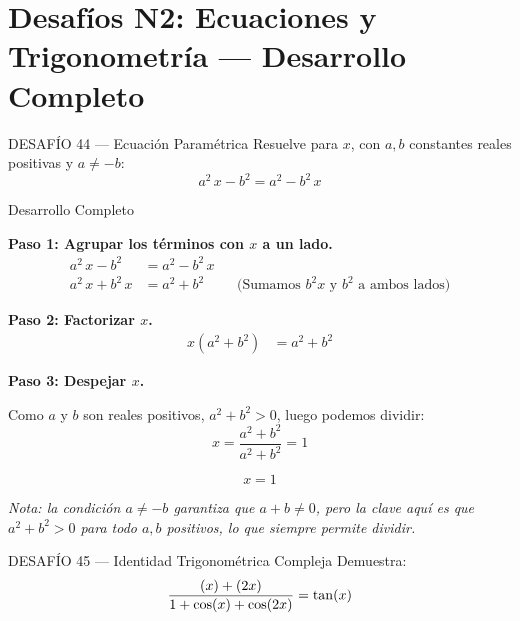 \documentclass[letterpaper, 12pt]{article}
\let\sin\relax
\DeclareMathOperator{\sin}{sen}
\begin{document}
\newpage

\section*{Desafíos N2: Ecuaciones y Trigonometría — Desarrollo Completo}

\begin{desafiobox}{DESAFÍO 44 — Ecuación Paramétrica}
Resuelve para $x$, con $a, b$ constantes reales positivas y $a \neq -b$:
\[
    a^2\,x - b^2 = a^2 - b^2\,x
\]
\end{desafiobox}

\begin{solucionbox}{Desarrollo Completo}

\textbf{Paso 1: Agrupar los términos con $x$ a un lado.}
\begin{align*}
    a^2\,x - b^2 &= a^2 - b^2\,x \\
    a^2\,x + b^2\,x &= a^2 + b^2 && \text{(Sumamos } b^2 x \text{ y } b^2 \text{ a ambos lados)}
\end{align*}

\textbf{Paso 2: Factorizar $x$.}
\begin{align*}
    x(a^2 + b^2) &= a^2 + b^2
\end{align*}

\textbf{Paso 3: Despejar $x$.}

Como $a$ y $b$ son reales positivos, $a^2 + b^2 > 0$, luego podemos dividir:
\[
    x = \frac{a^2 + b^2}{a^2 + b^2} = 1
\]

\[\boxed{x = 1}\]

\textit{Nota: la condición $a \neq -b$ garantiza que $a + b \neq 0$, pero la clave aquí es que $a^2 + b^2 > 0$ para todo $a, b$ positivos, lo que siempre permite dividir.}
\end{solucionbox}

\vspace{0.6cm}

\begin{desafiobox}{DESAFÍO 45 — Identidad Trigonométrica Compleja}
Demuestra:
\[
    \frac{\sin(x) + \sin(2x)}{1 + \cos(x) + \cos(2x)} = \tan(x)
\]
\end{desafiobox}
\end{document}
